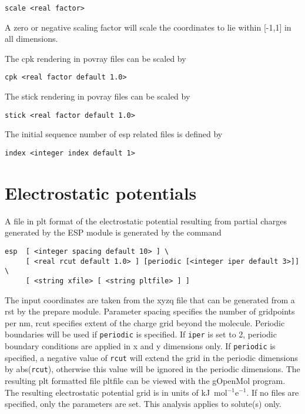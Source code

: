 \begin{verbatim}
scale <real factor>
\end{verbatim}

A zero or negative scaling factor will scale the coordinates to
lie within [-1,1] in all dimensions.
\par
The cpk rendering in povray files can be scaled by

\begin{verbatim}
cpk <real factor default 1.0>
\end{verbatim}
\par

The stick rendering in povray files can be scaled by

\begin{verbatim}
stick <real factor default 1.0>
\end{verbatim}

The initial sequence number of esp related files is defined by

\begin{verbatim}
index <integer index default 1>
\end{verbatim}

\section{Electrostatic potentials}

A file in plt format of the electrostatic potential resulting
from partial charges generated by the ESP module is generated
by the command

\begin{verbatim}
esp  [ <integer spacing default 10> ] \
     [ <real rcut default 1.0> ] [periodic [<integer iper default 3>]] \
     [ <string xfile> [ <string pltfile> ] ]
\end{verbatim}

The input coordinates are taken from the {\rm xyzq} file that can
be generated from a {\rm rst} by the prepare module. Parameter 
spacing specifies the number of gridpoints per nm, rcut specifies 
extent of the charge grid beyond the molecule.
Periodic boundaries will be used if \verb+periodic+
is specified. If \verb+iper+ is set to 2, periodic boundary
conditions are applied in x and y dimensions only. If \verb+periodic+
is specified, a negative value of \verb+rcut+ will extend the grid
in the periodic dimensions by abs(\verb+rcut+), otherwise this value
will be ignored in the periodic dimensions.
The resulting {\rm plt} formatted file pltfile can be
viewed with the gOpenMol program. The resulting electrostatic 
potential grid is in units of kJ\ mol$^{-1}$e$^{-1}$.
If no files are specified, only the parameters are set. This
analysis applies to solute(s) only.

